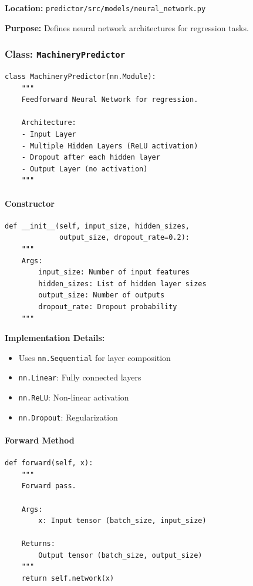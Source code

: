 \documentclass[11pt,a4paper]{article}
\begin{document}
\textbf{Location:} \texttt{predictor/src/models/neural\_network.py}

\textbf{Purpose:} Defines neural network architectures for regression tasks.

\subsubsection{Class: \texttt{MachineryPredictor}}

\begin{lstlisting}
class MachineryPredictor(nn.Module):
    """
    Feedforward Neural Network for regression.

    Architecture:
    - Input Layer
    - Multiple Hidden Layers (ReLU activation)
    - Dropout after each hidden layer
    - Output Layer (no activation)
    """
\end{lstlisting}

\paragraph{Constructor}
\begin{lstlisting}
def __init__(self, input_size, hidden_sizes,
             output_size, dropout_rate=0.2):
    """
    Args:
        input_size: Number of input features
        hidden_sizes: List of hidden layer sizes
        output_size: Number of outputs
        dropout_rate: Dropout probability
    """
\end{lstlisting}

\textbf{Implementation Details:}
\begin{itemize}
    \item Uses \texttt{nn.Sequential} for layer composition
    \item \texttt{nn.Linear}: Fully connected layers
    \item \texttt{nn.ReLU}: Non-linear activation
    \item \texttt{nn.Dropout}: Regularization
\end{itemize}

\paragraph{Forward Method}
\begin{lstlisting}
def forward(self, x):
    """
    Forward pass.

    Args:
        x: Input tensor (batch_size, input_size)

    Returns:
        Output tensor (batch_size, output_size)
    """
    return self.network(x)
\end{lstlisting}
\end{document}
